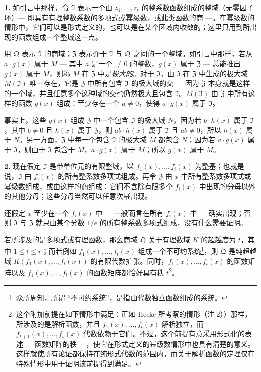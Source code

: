 \noindent\textbf{1.}
如引言中那样，令 $\mathfrak{I}$ 表示一个由 $z_1,\ldots,z_r$ 的整系数函数组成的整域（无零因子环）--- 即具有有理整数系数的多项式或幂级数，或此类函数的商 ---。在幂级数的情形中，它们可以是形式定义的，也可以是在某个区域内收敛的；这里只用到所出现的函数组成一个整域这一点。

用 $\mathfrak{Q}$ 表示 $\mathfrak{I}$ 的商域；$\mathfrak{Z}$ 表示介于 $\mathfrak{I}$ 与 $\mathfrak{Q}$ 之间的一个整域。如引言中那样，若从 $a \cdot g(x)$ 属于 $M$ --- 其中 $a$ 是一个 $\neq 0$ 的整数，$g(x)$ 属于 $\mathfrak{Z}$ --- 总能推出 $g(x)$ 属于 $M$，则称 $M$ 在 $\mathfrak{Z}$ 中是\textit{极大的}。对于 $\mathfrak{I}$，由 $\mathfrak{I}$ 在 $\mathfrak{Z}$ 中生成的极大域 $M(\mathfrak{I})$ 唯一存在，它是 $\mathfrak{Z}$ 中所有包含 $\mathfrak{I}$ 的极大域的交 --- 因为 $\mathfrak{Z}$ 本身就是这样的一个域，并且任意多个这种域的交也仍然极大且包含 $\mathfrak{I}$。$M(\mathfrak{I})$ 由 $\mathfrak{Z}$ 中所有这样的函数 $g(x)$ 组成：至少存在一个 $a \neq 0$，使得 $a \cdot g(x)$ 属于 $\mathfrak{I}$。

事实上，这些 $g(x)$ 组成 $\mathfrak{Z}$ 中一个包含 $\mathfrak{I}$ 的极大域 $N$，因为若 $b \cdot h(x)$ 属于 $\mathfrak{I}$，其中 $b \neq 0$ 且 $h(x)$ 属于 $\mathfrak{Z}$，则 $ab \cdot h(x)$ 属于 $\mathfrak{I}$ 且 $ab \neq 0$，所以 $h(x)$ 属于 $N$。另一方面，$\mathfrak{Z}$ 中每一个包含 $\mathfrak{I}$ 的极大域 $M$ 都包含 $N$；因为若 $a \cdot g(x)$ 属于 $\mathfrak{I}$，则由于 $\mathfrak{I}$ 包含于 $M$，$a \cdot g(x)$ 属于 $M$；所以 $g(x)$ 属于 $M$。

\medskip\noindent\textbf{2.}
现在假定 $\mathfrak{I}$ 是带单位元的有限整域，以 $f_1(x),\ldots,f_t(x)$ 为整基；也就是说，$\mathfrak{I}$ 由 $f_i(x)$ 的所有整系数多项式组成。再令 $\mathfrak{Z}$ 由 $x$ 中所有整系数多项式或幂级数组成，或由这样的商组成：它们不含除有限多个 $f_i(x)$ 中出现的分母以外的其他分母；这些分母当然可以任意次幂出现。

还假定 $x$ 至少在一个 $f_i(x)$ 中 --- 一般而言在所有 $f_i(x)$ 中 --- 确实出现；否则 $\mathfrak{I}$ 与 $\mathfrak{Z}$ 就只由某个分数 $1/e$ 的所有整系数多项式组成，没有什么需要证明。

若所涉及的是多项式或有理函数，那么商域 $\mathfrak{Q}$ 关于有理数域 $K$ 的超越度为 $t$，其中 $1 \leq t \leq r$；而若例如 $f_1(x),\ldots,f_t(x)$ 组成一个不可约系统\footnote{众所周知，所谓 ``不可约系统''，是指由代数独立函数组成的系统。}，则 $\mathfrak{Q}$ 是纯超越域 $K(f_1(x),\ldots,f_t(x))$ 的有限代数扩张。同时，$f_1(x),\ldots,f_t(x)$ 的函数矩阵以及 $f_1(x),\ldots,f_t(x)$ 的函数矩阵都恰好具有秩 $t$\footnote{这个附加前提在如下情形中满足：正如 Hecke 所考察的情形（注 2））那样，所涉及的是解析函数，并且 $f_1(x),\ldots,f_t(x)$ 解析独立，而 $f_{t+1}(x),\ldots,f_s(x)$ 代数依赖于它们。不过，这个前提有意采用形式化的表述 --- 函数矩阵的秩 ---，使它在形式定义的幂级数情形中也具有清楚的意义。这样就使所有论证都保持在纯形式代数的范围内，而关于解析函数的定理仅在特殊情形中用于证明该前提得到满足。}。

